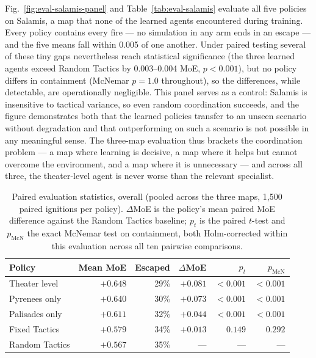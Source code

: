 Fig.~\ref{fig:eval-salamis-panel} and Table~\ref{tab:eval-salamis} evaluate
all five policies on Salamis, a map that none of the learned agents
encountered during training. Every policy contains every fire --- no
simulation in any arm ends in an escape --- and the five means fall within
0.005 of one another. Under paired testing several of these tiny gaps
nevertheless reach statistical significance (the three learned agents exceed
Random Tactics by 0.003--0.004 MoE, $p < 0.001$), but no policy differs in
containment (McNemar $p = 1.0$ throughout), so the differences, while
detectable, are operationally negligible. This panel serves as a control:
Salamis is insensitive to tactical variance, so even random coordination
succeeds, and the figure demonstrates both that the learned policies transfer
to an unseen scenario without degradation and that outperforming on such a
scenario is not possible in any meaningful sense. The three-map evaluation
thus brackets the coordination problem --- a map where learning is decisive,
a map where it helps but cannot overcome the environment, and a map where it
is unnecessary --- and across all three, the theater-level agent is never
worse than the relevant specialist.

\begin{table}[t]
  \centering
  \caption{Paired evaluation statistics, overall (pooled across the three
    maps, 1{,}500 paired ignitions per policy). $\Delta$MoE is the policy's
    mean paired MoE difference against the Random Tactics baseline; $p_t$ is
    the paired $t$-test and $p_{\mathrm{McN}}$ the exact McNemar test on
    containment, both Holm-corrected within this evaluation across all ten
    pairwise comparisons.}
  \label{tab:eval-overall}
  \begin{tabular}{lrrrrr}
    \toprule
    Policy & Mean MoE & Escaped & $\Delta$MoE & $p_t$ & $p_{\mathrm{McN}}$ \\
    \midrule
    Theater level & $+0.648$ & 29\% & $+0.081$ & $<\!0.001$ & $<\!0.001$ \\
    Pyrenees only & $+0.640$ & 30\% & $+0.073$ & $<\!0.001$ & $<\!0.001$ \\
    Palisades only & $+0.611$ & 32\% & $+0.044$ & $<\!0.001$ & $<\!0.001$ \\
    Fixed Tactics & $+0.579$ & 34\% & $+0.013$ & $0.149$ & $0.292$ \\
    Random Tactics & $+0.567$ & 35\% & --- & --- & --- \\
    \bottomrule
  \end{tabular}
\end{table}

